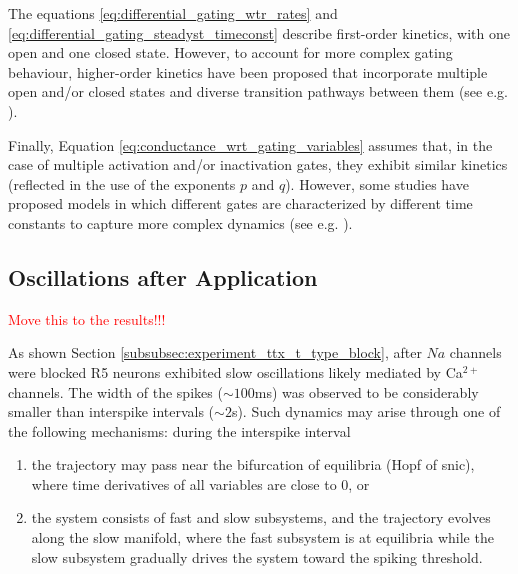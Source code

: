 \documentclass[../main.tex]{subfiles}
\begin{document}
The equations \ref{eq:differential_gating_wtr_rates} and \ref{eq:differential_gating_steadyst_timeconst} describe first-order kinetics, with one open and one
closed state. However, to account for more complex gating behaviour, higher-order kinetics have been proposed that incorporate multiple open and/or closed states and diverse transition pathways
between them (see e.g. \parencite{wangModelTtypeCalcium1991,brunoUsingIndependentOpentoclosed2005}).

Finally, Equation \ref{eq:conductance_wrt_gating_variables} assumes that, in the case of multiple activation and/or inactivation gates, they exhibit similar kinetics (reflected in the use of the exponents $p$ and $q$). However, some studies have proposed models in which different gates are characterized by different time constants to capture more complex dynamics (see e.g. \parencite{destexheModelInwardCurrent1993}).


\subsection{Oscillations after  Application} \label{subsec:math_backg_ttx_oscillations}

\textcolor{red}{Move this to the results!!!}

As shown Section \ref{subsubsec:experiment_ttx_t_type_block}, after $Na$ channels were blocked
R5 neurons exhibited slow oscillations likely mediated by Ca$^{2+}$ channels. The width of the spikes ($\sim 100$ms) was observed to be considerably smaller than interspike intervals ($\sim 2$s).
Such dynamics may arise through one of the following mechanisms: during the interspike interval
\begin{enumerate}
    \item the trajectory may pass near the bifurcation of equilibria (Hopf of \gls{snic}), where time derivatives of all variables are close to $0$, or
    \item the system consists of fast and slow subsystems, and the trajectory evolves along the slow manifold, where the fast subsystem is at equilibria while the slow subsystem gradually drives the system toward the spiking threshold.
\end{enumerate}
\end{document}

